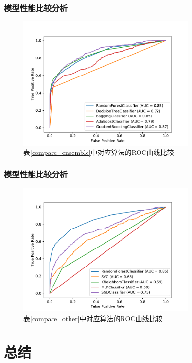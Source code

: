 \documentclass[10pt,aspectratio=43,mathserif]{beamer}
\begin{document}
          \begin{frame}
            \frametitle{\textbf{模型性能比较分析}}
            \begin{figure}[htbp!]
                \centering \includegraphics[width=0.8\textwidth]{figures/intra_whole_roc.pdf} 
                \caption{表\ref{compare_ensemble}中对应算法的ROC曲线比较}
            \end{figure}
          \end{frame}

          \begin{frame}
            \frametitle{\textbf{模型性能比较分析}}
            \begin{figure}[htbp!]
                \centering \includegraphics[width=0.8\textwidth]{figures/inter_whole_roc.pdf} 
                \caption{表\ref{compare_other}中对应算法的ROC曲线比较}
            \end{figure}
          \end{frame}
\section[结论]{总结}
\end{document}
